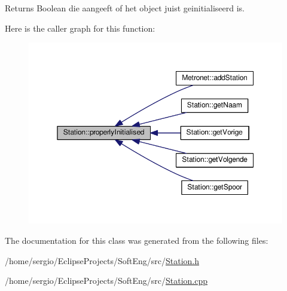 \begin{DoxyReturn}{Returns}
Boolean die aangeeft of het object juist geinitialiseerd is. 
\end{DoxyReturn}
Here is the caller graph for this function\+:\nopagebreak
\begin{figure}[H]
\begin{center}
\leavevmode
\includegraphics[width=350pt]{class_station_a9ce626dd0599e3ea8107404a59c21e16_icgraph}
\end{center}
\end{figure}


The documentation for this class was generated from the following files\+:\begin{DoxyCompactItemize}
\item 
/home/sergio/\+Eclipse\+Projects/\+Soft\+Eng/src/\hyperlink{_station_8h}{Station.\+h}\item 
/home/sergio/\+Eclipse\+Projects/\+Soft\+Eng/src/\hyperlink{_station_8cpp}{Station.\+cpp}\end{DoxyCompactItemize}
